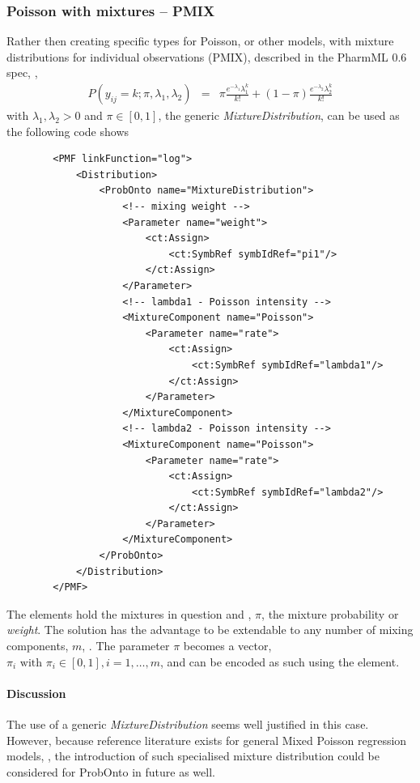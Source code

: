 {\subsubsection{Poisson with mixtures -- PMIX}
Rather then creating specific types for Poisson, or other models, with mixture distributions for 
individual observations (PMIX), described in the PharmML 0.6 spec, \cite{Pharmml_06},
\begin{eqnarray}
P(y_{ij} = k;\pi,\lambda_1,\lambda_2) &=& \pi \frac{e^{-\lambda_1} \lambda_1^k}{k!} + (1-\pi) \frac{e^{-\lambda_2} \lambda_2^k}{k!} \nonumber
\end{eqnarray}
with $\lambda_1, \lambda_2 > 0$ and $\pi \in [0,1]$, the generic \emph{MixtureDistribution}, 
can be used as the following code shows
\lstset{language=XML}
\begin{lstlisting}
        <PMF linkFunction="log">
            <Distribution>
                <ProbOnto name="MixtureDistribution">
                    <!-- mixing weight -->
                    <Parameter name="weight">
                        <ct:Assign>
                            <ct:SymbRef symbIdRef="pi1"/>
                        </ct:Assign>
                    </Parameter>
                    <!-- lambda1 - Poisson intensity -->
                    <MixtureComponent name="Poisson">
                        <Parameter name="rate">
                            <ct:Assign>
                                <ct:SymbRef symbIdRef="lambda1"/>
                            </ct:Assign>
                        </Parameter>
                    </MixtureComponent>
                    <!-- lambda2 - Poisson intensity -->
                    <MixtureComponent name="Poisson">
                        <Parameter name="rate">
                            <ct:Assign>
                                <ct:SymbRef symbIdRef="lambda2"/>
                            </ct:Assign>
                        </Parameter>
                    </MixtureComponent>
                </ProbOnto>
            </Distribution>
        </PMF>
\end{lstlisting}
The  elements hold the mixtures in question and 
, $\pi$, the mixture probability or \emph{weight}. The solution has the advantage 
to be extendable to any number of mixing components, $m$, \cite{Forbes:2010jk}. 
The parameter $\pi$ becomes a vector, $\pi_i \text{ with } \pi_i \in [0,1], i=1,\dots,m$, 
and can be encoded as such using the  element.
\paragraph{Discussion}
The use of a generic \emph{MixtureDistribution} seems well justified in this case. 
However, because reference literature exists for general Mixed Poisson regression models, 
\cite{Wang:1996fj}, the introduction of such specialised mixture distribution 
could be considered for ProbOnto in future as well.



}
